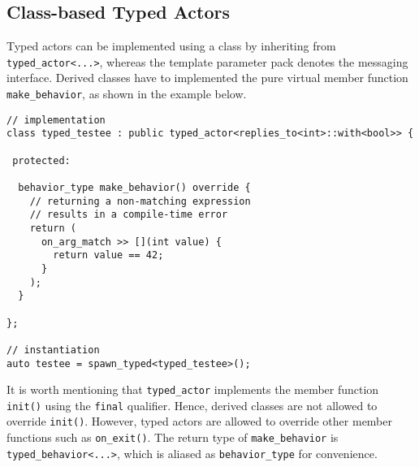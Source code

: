 \clearpage
\subsection{Class-based Typed Actors}

Typed actors can be implemented using a class by inheriting from \lstinline^typed_actor<...>^, whereas the template parameter pack denotes the messaging interface.
Derived classes have to implemented the pure virtual member function \lstinline^make_behavior^, as shown in the example below.

\begin{lstlisting}
// implementation
class typed_testee : public typed_actor<replies_to<int>::with<bool>> {

 protected:

  behavior_type make_behavior() override {
    // returning a non-matching expression 
    // results in a compile-time error
    return (
      on_arg_match >> [](int value) {
        return value == 42;
      }
    );
  }

};

// instantiation
auto testee = spawn_typed<typed_testee>();
\end{lstlisting}

It is worth mentioning that \lstinline^typed_actor^ implements the member function \lstinline^init()^ using the \lstinline^final^ qualifier.
Hence, derived classes are not allowed to override \lstinline^init()^.
However, typed actors are allowed to override other member functions such as \lstinline^on_exit()^.
The return type of \lstinline^make_behavior^ is \lstinline^typed_behavior<...>^, which is aliased as \lstinline^behavior_type^ for convenience.
